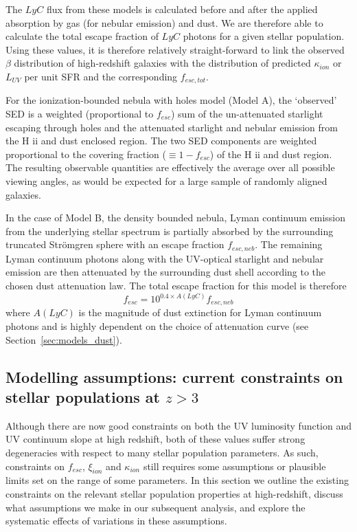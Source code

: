 The $LyC$ flux from these models is calculated before and after the applied absorption by gas (for nebular emission) and dust. We are therefore able to calculate the total escape fraction of $LyC$ photons for a given stellar population. Using these values, it is therefore relatively straight-forward to link the observed $\beta$ distribution of high-redshift galaxies with the distribution of predicted $\kappa_{ion}$ or $L_{UV}$ per unit SFR and the corresponding $f_{esc,tot}$.

For the ionization-bounded nebula with holes model (Model A), the `observed' SED is a weighted (proportional to $f_{esc}$) sum of the un-attenuated starlight escaping through holes and the attenuated starlight and nebular emission from the H {\sc ii} and dust enclosed region. The two SED components are weighted proportional to the covering fraction ($\equiv 1 - f_{esc}$) of the H {\sc ii} and dust region. The resulting observable quantities are effectively the average over all possible viewing angles, as would be expected for a large sample of randomly aligned galaxies.

In the case of Model B, the density bounded nebula, Lyman continuum emission from the underlying stellar spectrum is partially absorbed by the surrounding truncated Str\"{o}mgren sphere with an escape fraction $f_{esc,neb}$. The remaining Lyman continuum photons along with the UV-optical starlight and nebular emission are then attenuated by the surrounding dust shell according to the chosen dust attenuation law. The total escape fraction for this model is therefore
\begin{equation}
f_{esc} = 10^{0.4\times A(LyC)}f_{esc,neb}
\end{equation}
where $A(LyC)$ is the magnitude of dust extinction for Lyman continuum photons and is highly dependent on the choice of attenuation curve (see Section~\ref{sec:models_dust}).

\subsection{Modelling assumptions: current constraints on stellar populations at $z>3$}\label{sec:assumptions}
Although there are now good constraints on both the UV luminosity function and UV continuum slope at high redshift, both of these values suffer strong degeneracies with respect to many stellar population parameters. As such, constraints on $f_{esc}$, $\xi_{ion}$ and $\kappa_{ion}$ still requires some assumptions or plausible limits set on the range of some parameters. In this section we outline the existing constraints on the relevant stellar population properties at high-redshift, discuss what assumptions we make in our subsequent analysis, and explore the systematic effects of variations in these assumptions.  

